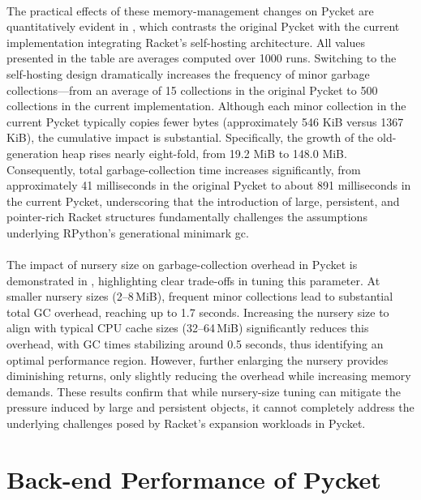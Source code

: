 		\paragraph{}%
			The practical effects of these memory-management changes on Pycket are quantitatively evident in , which contrasts the original Pycket with the current implementation integrating Racket's self-hosting architecture. All values presented in the table are averages computed over 1000 runs. Switching to the self-hosting design dramatically increases the frequency of minor garbage collections—from an average of 15 collections in the original Pycket to 500 collections in the current implementation. Although each minor collection in the current Pycket typically copies fewer bytes (approximately 546 KiB versus 1367 KiB), the cumulative impact is substantial. Specifically, the growth of the old-generation heap rises nearly eight-fold, from 19.2 MiB to 148.0 MiB. Consequently, total garbage-collection time increases significantly, from approximately 41 milliseconds in the original Pycket to about 891 milliseconds in the current Pycket, underscoring that the introduction of large, persistent, and pointer-rich Racket structures fundamentally challenges the assumptions underlying RPython's generational minimark \gls{gc}.


		\paragraph{}%
			The impact of nursery size on garbage-collection overhead in Pycket is demonstrated in , highlighting clear trade-offs in tuning this parameter. At smaller nursery sizes (2--8\,MiB), frequent minor collections lead to substantial total GC overhead, reaching up to 1.7 seconds. Increasing the nursery size to align with typical CPU cache sizes (32--64\,MiB) significantly reduces this overhead, with GC times stabilizing around 0.5 seconds, thus identifying an optimal performance region. However, further enlarging the nursery provides diminishing returns, only slightly reducing the overhead while increasing memory demands. These results confirm that while nursery-size tuning can mitigate the pressure induced by large and persistent objects, it cannot completely address the underlying challenges posed by Racket's expansion workloads in Pycket.

	\section[\texorpdfstring{Back-end Performance of Pycket}{Back-end Performance}]{Back-end Performance of Pycket}
	\label{section:cross-benchmarks}

